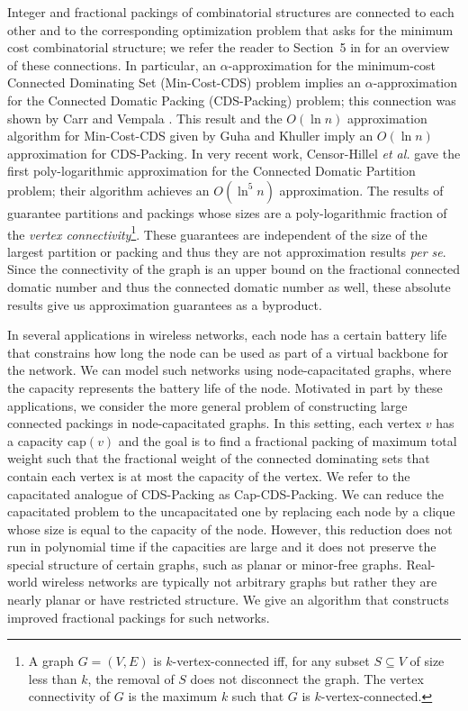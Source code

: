 \documentclass[11pt]{article}
\def\etal{\emph{et al.}\xspace}
\def\prob#1{\textsf{\textup{#1}}\xspace}
\def\capacity{\mathrm{cap}}
\def\CDSpack{\prob{CDS-Packing}}
\def\capCDSpack{\prob{Cap-CDS-Packing}}
\def\minCDS{\prob{Min-Cost-CDS}}
\begin{document}
Integer and fractional packings of combinatorial structures are
connected to each other and to the corresponding optimization problem
that asks for the minimum cost combinatorial structure; we refer the
reader to Section~{5} in \cite{CalinescuCV09} for an overview of
these connections. In particular, an $\alpha$-approximation for the
minimum-cost \prob{Connected Dominating Set} (\minCDS) problem implies an
$\alpha$-approximation for the \prob{Connected Domatic Packing}
(\CDSpack) problem; this connection was shown by
Carr and Vempala \cite{CarrV02}.  This result and the $O(\ln{n})$
approximation algorithm for \minCDS given by Guha and Khuller
\cite{GuhaK98} imply an $O(\ln{n})$ approximation for \CDSpack. In
very recent work, Censor-Hillel \etal \cite{CHGK} gave the first
poly-logarithmic approximation for the \prob{Connected Domatic
Partition} problem; their algorithm achieves
an $O(\ln^5{n})$ approximation. The results of \cite{CHGK} guarantee
partitions and packings whose sizes are a poly-logarithmic fraction
of the \emph{vertex connectivity}\footnote{A graph $G = (V, E)$ is
$k$-vertex-connected iff, for any subset $S \subseteq V $ of size
less than $k$, the removal of $S$ does not disconnect the graph. The
vertex connectivity of $G$ is the maximum $k$ such that $G$ is
$k$-vertex-connected.}. These guarantees are independent of the size
of the largest partition or packing and thus they are not
approximation results \emph{per se}.  Since the connectivity of the
graph is an upper bound on the fractional connected domatic number
and thus the connected domatic number as well, these absolute results
give us approximation guarantees as a byproduct.

In several applications in wireless networks, each node has a certain
battery life that constrains how long the node can be used as part of
a virtual backbone for the network. We can model such networks using
node-capacitated graphs, where the capacity represents the battery
life of the node. Motivated in part by these applications, we
consider the more general problem of constructing large connected
packings in node-capacitated graphs. In this setting, each vertex $v$
has a capacity $\capacity(v)$ and the goal is to find a fractional
packing of maximum total weight such that the fractional weight of
the connected dominating sets that contain each vertex is at most the
capacity of the vertex. We refer to the capacitated analogue of
\CDSpack as \capCDSpack.  We can reduce the capacitated problem to
the uncapacitated one by replacing each node by a clique whose size
is equal to the capacity of the node. However, this reduction does
not run in polynomial time if the capacities are large and it does
not preserve the special structure of certain graphs, such as planar
or minor-free graphs.  Real-world wireless networks are typically not
arbitrary graphs but rather they are nearly planar or have restricted
structure. We give an algorithm that constructs improved fractional
packings for such networks.
\end{document}
